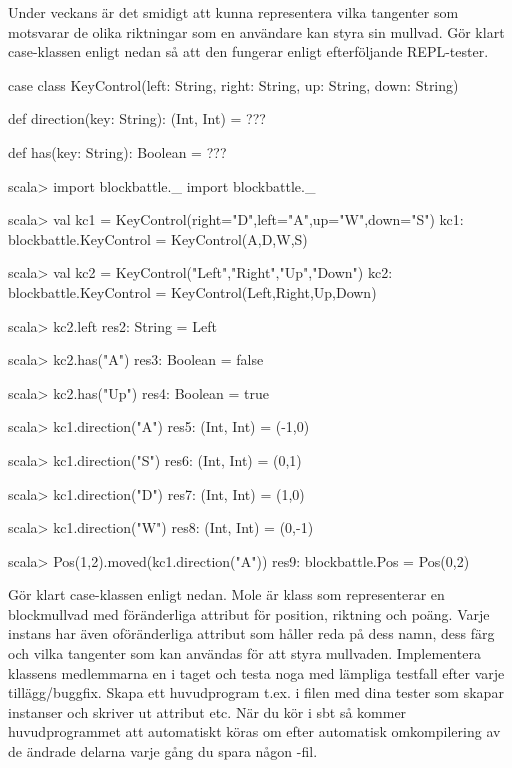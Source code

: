\Subtask Under veckans är det smidigt att kunna representera vilka tangenter som motsvarar de olika riktningar som en användare kan styra sin mullvad. Gör klart case-klassen  enligt nedan så att den fungerar enligt efterföljande REPL-tester.
\begin{CodeSmall}
case class KeyControl(left: String, right: String, up: String, down: String){
  def direction(key: String): (Int, Int) = ???

  def has(key: String): Boolean = ???
}
\end{CodeSmall}
\begin{REPL}
scala> import blockbattle._
import blockbattle._

scala> val kc1 = KeyControl(right="D",left="A",up="W",down="S")
kc1: blockbattle.KeyControl = KeyControl(A,D,W,S)

scala> val kc2 = KeyControl("Left","Right","Up","Down")
kc2: blockbattle.KeyControl = KeyControl(Left,Right,Up,Down)

scala> kc2.left
res2: String = Left

scala> kc2.has("A")
res3: Boolean = false

scala> kc2.has("Up")
res4: Boolean = true

scala> kc1.direction("A")
res5: (Int, Int) = (-1,0)

scala> kc1.direction("S")
res6: (Int, Int) = (0,1)

scala> kc1.direction("D")
res7: (Int, Int) = (1,0)

scala> kc1.direction("W")
res8: (Int, Int) = (0,-1)

scala> Pos(1,2).moved(kc1.direction("A"))
res9: blockbattle.Pos = Pos(0,2)
\end{REPL}


\Subtask Gör klart case-klassen  enligt nedan. Mole är klass som representerar en blockmullvad med föränderliga attribut för position, riktning och poäng. Varje instans har även oföränderliga attribut som håller reda på dess namn, dess färg och vilka tangenter som kan användas för att styra mullvaden. Implementera klassens medlemmarna en i taget och testa noga med lämpliga testfall efter varje tillägg/buggfix. Skapa ett huvudprogram t.ex. i filen  med dina tester som skapar instanser och skriver ut attribut etc. När du kör  i sbt så kommer huvudprogrammet att automatiskt köras om efter automatisk omkompilering av de ändrade delarna varje gång du spara någon -fil.

